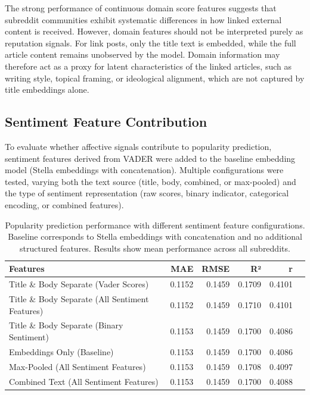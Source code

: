 The strong performance of continuous domain score features suggests that subreddit communities exhibit systematic differences in how linked external content is received. However, domain features should not be interpreted purely as reputation signals. For link posts, only the title text is embedded, while the full article content remains unobserved by the model. Domain information may therefore act as a proxy for latent characteristics of the linked articles, such as writing style, topical framing, or ideological alignment, which are not captured by title embeddings alone.


\subsection{Sentiment Feature Contribution}

To evaluate whether affective signals contribute to popularity prediction, sentiment features derived from VADER were added to the baseline embedding model (Stella embeddings with concatenation). 
Multiple configurations were tested, varying both the text source (title, body, combined, or max-pooled) and the type of sentiment representation (raw scores, binary indicator, categorical encoding, or combined features).

\begin{table}[htbp]
\centering
\caption{Popularity prediction performance with different sentiment feature configurations. Baseline corresponds to Stella embeddings with concatenation and no additional structured features. Results show mean performance across all subreddits.}
\label{tab:sentiment_features}
\begin{tabular}{lrrrrr}
\toprule
Features & MAE & RMSE & R² & r  \\
\midrule
Title \& Body Separate (Vader Scores) & 0.1152 & 0.1459 & 0.1709 & 0.4101  \\
Title \& Body Separate (All Sentiment Features) & 0.1152 & 0.1459 & 0.1710 & 0.4101  \\
Title \& Body Separate (Binary Sentiment) & 0.1153 & 0.1459 & 0.1700 & 0.4086  \\
Embeddings Only (Baseline) & 0.1153 & 0.1459 & 0.1700 & 0.4086  \\
Max-Pooled (All Sentiment Features) & 0.1153 & 0.1459 & 0.1708 & 0.4097  \\
Combined Text (All Sentiment Features) & 0.1153 & 0.1459 & 0.1700 & 0.4088  \\
\bottomrule
\end{tabular}
\end{table}

